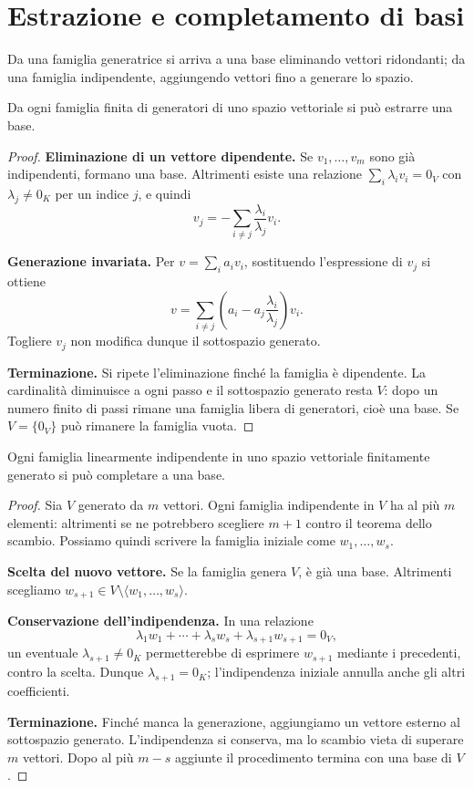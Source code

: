 
\section{Estrazione e completamento di basi}

Da una famiglia generatrice si arriva a una base eliminando vettori ridondanti; da una famiglia indipendente, aggiungendo vettori fino a generare lo spazio.

\begin{corollario}
Da ogni famiglia finita di generatori di uno spazio vettoriale si può estrarre una base.
\end{corollario}
\begin{proof}
\textbf{Eliminazione di un vettore dipendente.} Se $v_1,\ldots,v_m$ sono già indipendenti, formano una base. Altrimenti esiste una relazione $\sum_i\lambda_iv_i=0_V$ con $\lambda_j\ne0_K$ per un indice $j$, e quindi
\[
  v_j=-\sum_{i\ne j}\frac{\lambda_i}{\lambda_j}v_i.
\]

\textbf{Generazione invariata.} Per $v=\sum_i a_iv_i$, sostituendo l'espressione di $v_j$ si ottiene
\[
  v=\sum_{i\ne j}\left(a_i-a_j\frac{\lambda_i}{\lambda_j}\right)v_i.
\]
Togliere $v_j$ non modifica dunque il sottospazio generato.

\textbf{Terminazione.} Si ripete l'eliminazione finché la famiglia è dipendente. La cardinalità diminuisce a ogni passo e il sottospazio generato resta $V$: dopo un numero finito di passi rimane una famiglia libera di generatori, cioè una base. Se $V=\{0_V\}$ può rimanere la famiglia vuota.
\end{proof}

\begin{corollario}
Ogni famiglia linearmente indipendente in uno spazio vettoriale finitamente generato si può completare a una base.
\end{corollario}
\begin{proof}
Sia $V$ generato da $m$ vettori. Ogni famiglia indipendente in $V$ ha al più $m$ elementi: altrimenti se ne potrebbero scegliere $m+1$ contro il teorema dello scambio. Possiamo quindi scrivere la famiglia iniziale come $w_1,\ldots,w_s$.

\textbf{Scelta del nuovo vettore.} Se la famiglia genera $V$, è già una base. Altrimenti scegliamo $w_{s+1}\in V\setminus\langle w_1,\ldots,w_s\rangle$.

\textbf{Conservazione dell'indipendenza.} In una relazione
\[
  \lambda_1w_1+\cdots+\lambda_sw_s+\lambda_{s+1}w_{s+1}=0_V,
\]
un eventuale $\lambda_{s+1}\ne0_K$ permetterebbe di esprimere $w_{s+1}$ mediante i precedenti, contro la scelta. Dunque $\lambda_{s+1}=0_K$; l'indipendenza iniziale annulla anche gli altri coefficienti.

\textbf{Terminazione.} Finché manca la generazione, aggiungiamo un vettore esterno al sottospazio generato. L'indipendenza si conserva, ma lo scambio vieta di superare $m$ vettori. Dopo al più $m-s$ aggiunte il procedimento termina con una base di $V$.
\end{proof}

